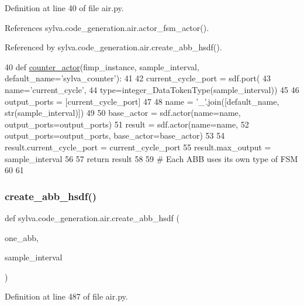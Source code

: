 Definition at line 40 of file air.\+py.



References sylva.\+code\+\_\+generation.\+air.\+actor\+\_\+fsm\+\_\+actor().



Referenced by sylva.\+code\+\_\+generation.\+air.\+create\+\_\+abb\+\_\+hsdf().


\begin{DoxyCode}
40 \textcolor{keyword}{def }\hyperlink{namespacesylva_1_1code__generation_1_1air_a50394584613c57985bc89c8fa14a058f}{counter\_actor}(fimp\_instance, sample\_interval, default\_name='sylva\_counter'):
41 
42     current\_cycle\_port = sdf.port(
43         name=\textcolor{stringliteral}{'current\_cycle'},
44         type=integer\_DataTokenType(sample\_interval))
45 
46     output\_ports = [current\_cycle\_port]
47 
48     name = \textcolor{stringliteral}{'\_'}.join([default\_name, str(sample\_interval)])
49 
50     base\_actor = sdf.actor(name=name, output\_ports=output\_ports)
51     result = sdf.actor(name=name,
52                        output\_ports=output\_ports, base\_actor=base\_actor)
53 
54     result.current\_cycle\_port = current\_cycle\_port
55     result.max\_output = sample\_interval
56 
57     \textcolor{keywordflow}{return} result
58 
59 \textcolor{comment}{# Each ABB uses its own type of FSM}
60 
61 
\end{DoxyCode}
\mbox{\label{namespacesylva_1_1code__generation_1_1air_a5a2588aa1c35ad4bd47d3b8f7eeca94a}} 
\subsubsection{\texorpdfstring{create\+\_\+abb\+\_\+hsdf()}{create\_abb\_hsdf()}}
{\footnotesize\ttfamily def sylva.\+code\+\_\+generation.\+air.\+create\+\_\+abb\+\_\+hsdf (\begin{DoxyParamCaption}\item[{}]{one\+\_\+abb,  }\item[{}]{sample\+\_\+interval }\end{DoxyParamCaption})}



Definition at line 487 of file air.\+py.



